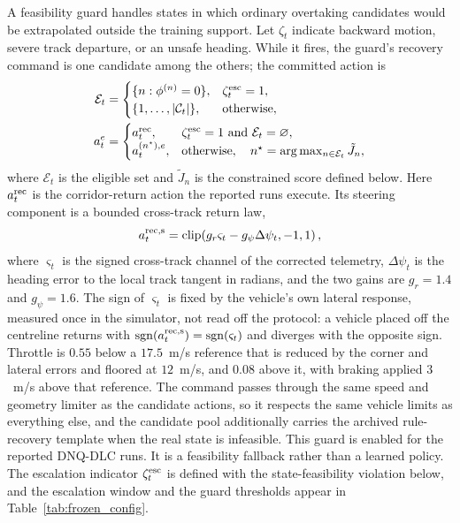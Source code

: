 \documentclass[journal]{IEEEtran}
\begin{document}
A feasibility guard handles states in which ordinary overtaking candidates
would be extrapolated outside the training support. Let $\zeta_t$ indicate
backward motion, severe track departure, or an unsafe heading. While it fires,
the guard's recovery command is one candidate among the others; the committed
action is
\begin{equation}
 \begin{aligned}
 \mathcal E_t&=\begin{cases}
 \{n:\phi^{(n)}=0\},&\zeta_t^{\rm esc}=1,\\
 \{1,\ldots,|\mathcal C_t|\},&\text{otherwise},
 \end{cases}\\
 a_t^e&=\begin{cases}
 a_t^{\rm rec},&\zeta_t^{\rm esc}=1\ \text{and}\ \mathcal E_t=\varnothing,\\
 a_t^{(n^\star),e},&\text{otherwise},\quad n^\star=\arg\max_{n\in\mathcal E_t}\tilde J_n,
 \end{cases}
 \end{aligned}
\label{eq:recovery_guard}
\end{equation}
where $\mathcal E_t$ is the eligible set and $\tilde J_n$ is the constrained
score defined below.
Here $a_t^{\rm rec}$ is the corridor-return action the reported runs execute.
Its steering component is a bounded cross-track return law,
\begin{equation}
 a_t^{\rm rec,s}=\operatorname{clip}\!\left(g_r\varsigma_t-g_\psi\Delta\psi_t,-1,1\right),
\label{eq:return_law}
\end{equation}
where $\varsigma_t$ is the signed cross-track channel of the corrected
telemetry, $\Delta\psi_t$ is the heading error to the local track tangent in
radians, and the two gains are $g_r=1.4$ and $g_\psi=1.6$. The sign of
$\varsigma_t$ is fixed by the vehicle's own lateral response, measured once in
the simulator, not read off the protocol: a vehicle placed off the centreline
returns with $\operatorname{sgn}(a_t^{\rm rec,s})=\operatorname{sgn}(\varsigma_t)$
and diverges with the opposite sign. Throttle is
$0.55$ below a $17.5$~m/s reference that is reduced by the corner and lateral
errors and floored at $12$~m/s, and $0.08$ above it, with braking applied
$3$~m/s above that reference. The command passes through
the same speed and geometry limiter as the candidate actions, so it respects the
same vehicle limits as everything else, and the candidate pool additionally
carries the archived rule-recovery template when the real state is infeasible.
This guard is enabled for the reported DNQ-DLC runs. It is a feasibility
fallback rather than a learned policy. The escalation indicator
$\zeta_t^{\rm esc}$ is defined with the state-feasibility violation below, and
the escalation window and the guard thresholds appear in
Table~\ref{tab:frozen_config}.
\end{document}
